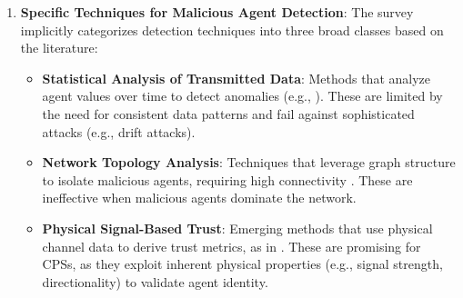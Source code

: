\documentclass{article}
\begin{document}
\begin{enumerate}
\begin{itemize}
        \item \textbf{Physical Channel-Based Validation}:
        \begin{itemize}
            \item \textbf{Emerging Approach}: CPSs offer additional physical channels (e.g., camera data, wireless signals, lidar, radar) that can validate transmitted data and quantify trust between agents \cite{ref11,ref12,ref13,ref14,ref44,ref45}.
            \item \textbf{Wireless Signals}: The wireless community has shown that signals can provide information for tracking, localization \cite{ref15,ref16,ref18,ref48,ref49,ref50}, authentication \cite{ref19,ref51,ref52}, and thwarting spoofing attacks \cite{ref53}. For example, directional signal profiles derived from channel state information can verify agent identity \cite{ref49,ref54}.
            \item \textbf{Trust Derivation}: The authors' prior work \cite{ref20} introduced a scalar trust value $\alpha_{ij} \in (-0.5, 0.5)$, computed from wireless signal profiles, which quantifies the likelihood that a transmission comes from a legitimate or spoofed node. This is particularly effective against Sybil attacks, where malicious agents impersonate multiple identities.
        \end{itemize}
    \end{itemize}
    
    \item \textbf{Specific Techniques for Malicious Agent Detection}:
    The survey implicitly categorizes detection techniques into three broad classes based on the literature:
    \begin{itemize}
        \item \textbf{Statistical Analysis of Transmitted Data}: Methods that analyze agent values over time to detect anomalies (e.g., \cite{ref8}). These are limited by the need for consistent data patterns and fail against sophisticated attacks (e.g., drift attacks).
        \item \textbf{Network Topology Analysis}: Techniques that leverage graph structure to isolate malicious agents, requiring high connectivity \cite{ref1,ref5,ref6}. These are ineffective when malicious agents dominate the network.
        \item \textbf{Physical Signal-Based Trust}: Emerging methods that use physical channel data to derive trust metrics, as in \cite{ref20,ref55,ref56}. These are promising for CPSs, as they exploit inherent physical properties (e.g., signal strength, directionality) to validate agent identity.
    \end{itemize}
    

\end{enumerate}
\end{document}

